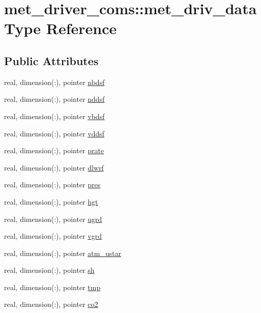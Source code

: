 \hypertarget{structmet__driver__coms_1_1met__driv__data}{}\section{met\+\_\+driver\+\_\+coms\+:\+:met\+\_\+driv\+\_\+data Type Reference}
\label{structmet__driver__coms_1_1met__driv__data}
\subsection*{Public Attributes}
\begin{DoxyCompactItemize}
\item 
real, dimension(\+:), pointer \hyperlink{structmet__driver__coms_1_1met__driv__data_a73eb1c63118c9f747dd518a5480cbf69}{nbdsf}
\item 
real, dimension(\+:), pointer \hyperlink{structmet__driver__coms_1_1met__driv__data_ae65706723939937d71a4b680bbf197c8}{nddsf}
\item 
real, dimension(\+:), pointer \hyperlink{structmet__driver__coms_1_1met__driv__data_a076a15466aba5e50972a1cee79503844}{vbdsf}
\item 
real, dimension(\+:), pointer \hyperlink{structmet__driver__coms_1_1met__driv__data_aadd9f7e24cc74f369724dd6443717e69}{vddsf}
\item 
real, dimension(\+:), pointer \hyperlink{structmet__driver__coms_1_1met__driv__data_ae96d5a2cd9b187b30975049a255c7236}{prate}
\item 
real, dimension(\+:), pointer \hyperlink{structmet__driver__coms_1_1met__driv__data_ad3c9308148b50e46d2ee0bde96c24981}{dlwrf}
\item 
real, dimension(\+:), pointer \hyperlink{structmet__driver__coms_1_1met__driv__data_a9b25ac3ba9616b7e619c2258b843c32c}{pres}
\item 
real, dimension(\+:), pointer \hyperlink{structmet__driver__coms_1_1met__driv__data_a0232ce1349247fd6e018ed35a4211b7a}{hgt}
\item 
real, dimension(\+:), pointer \hyperlink{structmet__driver__coms_1_1met__driv__data_a903c5d0a30902ac4e81d1f75b24393e1}{ugrd}
\item 
real, dimension(\+:), pointer \hyperlink{structmet__driver__coms_1_1met__driv__data_a1bdf2521eb3332db96d2127a7d5a0294}{vgrd}
\item 
real, dimension(\+:), pointer \hyperlink{structmet__driver__coms_1_1met__driv__data_a708a35b2868575ec15ae8bd334e15843}{atm\+\_\+ustar}
\item 
real, dimension(\+:), pointer \hyperlink{structmet__driver__coms_1_1met__driv__data_a9d5d32f397dfb3e613b94882460d831f}{sh}
\item 
real, dimension(\+:), pointer \hyperlink{structmet__driver__coms_1_1met__driv__data_a877bc78ad597380113113ebb57a2a31e}{tmp}
\item 
real, dimension(\+:), pointer \hyperlink{structmet__driver__coms_1_1met__driv__data_aaf679214b07f53c71389a680c08511e5}{co2}
\end{DoxyCompactItemize}


